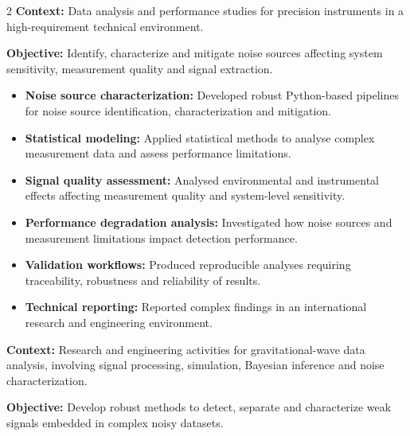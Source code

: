 \documentclass[8pt,a4paper,ragged2e,withhyper]{altacv}
\begin{document}
\begin{paracol}{2}
\textbf{Context:} Data analysis and performance studies for precision instruments in a high-requirement technical environment.

\textbf{Objective:} Identify, characterize and mitigate noise sources affecting system sensitivity, measurement quality and signal extraction.

\begin{itemize}
\item \textbf{Noise source characterization:} Developed robust Python-based pipelines for noise source identification, characterization and mitigation.
\item \textbf{Statistical modeling:} Applied statistical methods to analyse complex measurement data and assess performance limitations.
\item \textbf{Signal quality assessment:} Analysed environmental and instrumental effects affecting measurement quality and system-level sensitivity.
\item \textbf{Performance degradation analysis:} Investigated how noise sources and measurement limitations impact detection performance.
\item \textbf{Validation workflows:} Produced reproducible analyses requiring traceability, robustness and reliability of results.
\item \textbf{Technical reporting:} Reported complex findings in an international research and engineering environment.
\end{itemize}

\divider


\textbf{Context:} Research and engineering activities for gravitational-wave data analysis, involving signal processing, simulation, Bayesian inference and noise characterization.

\textbf{Objective:} Develop robust methods to detect, separate and characterize weak signals embedded in complex noisy datasets.


\end{paracol}
\end{document}

